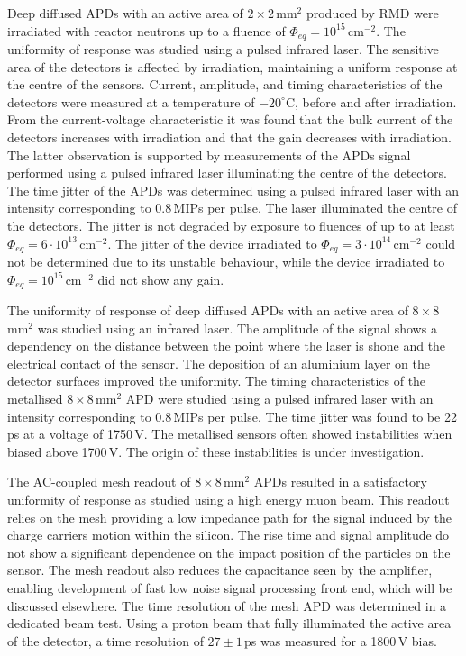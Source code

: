 \documentclass[review,number,sort&compress]{elsarticle}
\begin{document}
Deep diffused APDs with an active area of $2 \times 2$\,mm$^2$ produced by RMD were irradiated with reactor neutrons up to a fluence of $\Phi_{eq} = 10^{15}$\,cm$^{-2}$.
The uniformity of response was studied using a pulsed infrared laser.
The sensitive area of the detectors is affected by irradiation, maintaining a uniform response at the centre of the sensors.
Current, amplitude, and timing characteristics of the detectors were measured at a temperature of $-20^\circ$C, before and after irradiation.
From the current-voltage characteristic it was found that the bulk current of the detectors increases with irradiation and that the gain decreases with irradiation.
The latter observation is supported by measurements of the APDs signal performed using a pulsed infrared laser illuminating the centre of the detectors.
The time jitter of the APDs was determined using a pulsed infrared laser with an intensity corresponding to 0.8\,MIPs per pulse.
The laser illuminated the centre of the detectors.
The jitter is not degraded by exposure to fluences of up to at least $\Phi_{eq} = 6 \cdot 10^{13}$\,cm$^{-2}$.
The jitter of the device irradiated to $\Phi_{eq} = 3 \cdot 10^{14}$\,cm$^{-2}$ could not be determined due to its unstable behaviour, while the device irradiated to $\Phi_{eq} = 10^{15}$\,cm$^{-2}$ did not show any gain.

The uniformity of response of deep diffused APDs with an active area of $8 \times 8$\,mm$^2$ was studied using an infrared laser.
The amplitude of the signal shows a dependency on the distance between the point where the laser is shone and the electrical contact of the sensor.
The deposition of an aluminium layer on the detector surfaces improved the uniformity.
The timing characteristics of the metallised $8 \times 8$\,mm$^2$ APD were studied using a pulsed infrared laser with an intensity corresponding to 0.8\,MIPs per pulse.
The time jitter was found to be 22\,ps at a voltage of 1750\,V.
The metallised sensors often showed instabilities when biased above 1700\,V.
The origin of these instabilities is under investigation.

The AC-coupled mesh readout of $8 \times 8$\,mm$^2$ APDs resulted in a satisfactory uniformity of response as studied using a high energy muon beam.
This readout relies on the mesh providing a low impedance path for the signal induced by the charge carriers motion within the silicon.
The rise time and signal amplitude do not show a significant dependence on the impact position of the particles on the sensor.
The mesh readout also reduces the capacitance seen by the amplifier, enabling development of fast low noise signal processing front end, which will be discussed elsewhere.
The time resolution of the mesh APD was determined in a dedicated beam test.
Using a proton beam that fully illuminated the active area of the detector, a time resolution of $27 \pm 1$\,ps was measured for a 1800\,V bias.
\end{document}
